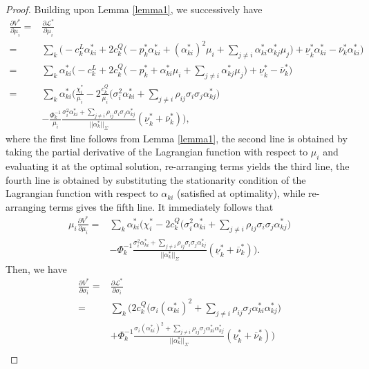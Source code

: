 \documentclass{article}
\begin{document}
\begin{proof}
Building upon Lemma \ref{lemma1}, we successively have
\begin{align*} 
\frac{\partial V^*}{\partial \mu_i} =& \frac{\partial \mathcal{L}^*}{\partial \mu_i}\\
=& \sum_k \Big(-c_k^L \alpha_{ki}^* + 2 c_k^Q \big(- p_k^* \alpha_{ki}^* + (\alpha_{ki}^*)^2 \mu_i + \sum_{j \ne i} \alpha_{ki}^* \alpha_{kj}^* \mu_j\big) + \underline{\nu}_k^* \alpha_{ki}^* - \overline{\nu}_k^* \alpha_{ki}^*\Big)\\
=& \sum_k \alpha_{ki}^* \Big(-c_k^L + 2 c_k^Q \big(- p_k^* + \alpha_{ki}^* \mu_i + \sum_{j \ne i} \alpha_{kj}^* \mu_j\big) + \underline{\nu}_k^* - \overline{\nu}_k^*\Big)\\
=& \sum_k \alpha_{ki}^* \Big(\frac{\chi_i^*}{\mu_i} - 2 \frac{c_k^Q}{\mu_i}\big(\sigma_i^2 \alpha_{ki}^* + \sum_{j \ne i} \rho_{ij} \sigma_i \sigma_j \alpha_{kj}^*\big)\\
 &- \frac{\Phi_k^{-1}}{\mu_i} \frac{\sigma_i^2 \alpha_{ki}^* + \sum_{j \ne i} \rho_{ij} \sigma_i \sigma_j  \alpha_{kj}^*}{||\alpha_k^*||_{\Sigma}}(\underline{\nu}_k^* + \overline{\nu}_k^*)\Big),
\end{align*}
where the first line follows from Lemma \ref{lemma1}, the second line is obtained by taking the partial derivative of the Lagrangian function with respect to $\mu_i$ and evaluating it at the optimal solution, re-arranging terms yields the third line, the fourth line is obtained by substituting the stationarity condition of the Lagrangian function with respect to $\alpha_{ki}$ (satisfied at optimality), while re-arranging terms gives the fifth line. It immediately follows that
\begin{align*}
\mu_i \frac{\partial V^*}{\partial \mu_i} =& \sum_k\alpha_{ki}^*\Big(\chi_i^* - 2 c_k^Q \big(\sigma_i^2 \alpha_{ki}^* + \sum_{j \ne i} \rho_{ij} \sigma_i \sigma_j \alpha_{kj}^*\big)\\
 &- \Phi_k^{-1} \frac{\sigma_i^2 \alpha_{ki}^* + \sum_{j \ne i} \rho_{ij} \sigma_i \sigma_j  \alpha_{kj}^*}{||\alpha_k^*||_{\Sigma}}(\underline{\nu}_k^* + \overline{\nu}_k^*)\Big).
\end{align*}
Then, we have
\begin{align*}
\frac{\partial V^*}{\partial \sigma_i} =& \frac{\partial \mathcal{L}^*}{\partial \sigma_i}\\
=& \sum_k \Big(2c_k^Q\big(\sigma_i (\alpha_{ki}^*)^2 + \sum_{j \ne i} \rho_{ij} \sigma_j \alpha_{ki}^*\alpha_{kj}^*\big)\\
&+ \Phi_k^{-1} \frac{\sigma_i (\alpha_{ki}^*)^2 + \sum_{j \ne i} \rho_{ij} \sigma_j \alpha_{ki}^*\alpha_{kj}^*}{||\alpha_k^*||_{\Sigma}}(\underline{\nu}_k^* + \overline{\nu}_k^*)\Big)\\

\end{align*}
\end{proof}
\end{document}
